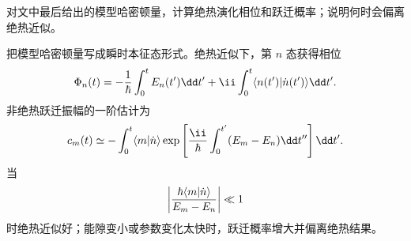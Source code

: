 \begin{question}
对文中最后给出的模型哈密顿量，计算绝热演化相位和跃迁概率；说明何时会偏离绝热近似。
\end{question}
\begin{solution}
把模型哈密顿量写成瞬时本征态形式。绝热近似下，第 $n$ 态获得相位
\[
\Phi_n(t)=-{1\over\hbar}\int_0^tE_n(t')\dd t'+\ii\int_0^t\langle n(t')|\dot n(t')\rangle\dd t'.
\]
非绝热跃迁振幅的一阶估计为
\[
c_m(t)\simeq-\int_0^t\langle m|\dot n\rangle
\exp\left[{\ii\over\hbar}\int_0^{t'}(E_m-E_n)\dd t''\right]\dd t'.
\]
当
\[
\left|{\hbar\langle m|\dot n\rangle\over E_m-E_n}\right|\ll1
\]
时绝热近似好；能隙变小或参数变化太快时，跃迁概率增大并偏离绝热结果。
\end{solution}

